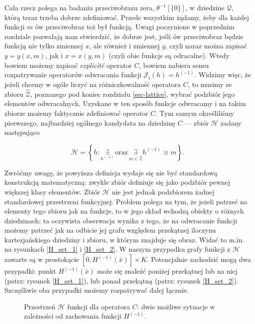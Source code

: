 Cała rzecz polega na badaniu przeciwobrazu zera, $\theta^{-1}[\{ 0 \}]$, w dziedzine $\mathcal{Q}$, którą teraz trzeba dobrze zdefiniować. Przede wszystkim żądamy, żeby dla każdej funkcji $m$ ów przeciwobraz też był funkcją. Uwagi poczynione w poprzednim rozdziale pozwalają nam stwierdzić, że dobrze jest, jeśli ów przeciwobraz będzie funkcją nie tylko zmiennej $x$, ale również i zmiennej $y$, czyli naraz można zapisać $y=y(x,m)$, jak i $x=x(y,m)$ (czyli obie funkcje są odracalne). Wtedy bowiem możemy zapisać {\it explicit\' e} operator $C$, bowiem nabiera sensu rozpatrywanie operatorów odwracania funkcji $\mathcal{J}_{i} (h) = h^{(-1)}$. Widzimy więc, że jeżeli chcemy w ogóle liczyć na różniczkowalność operatora $C$, to musimy ze zbioru $\hat{\mathcal{Z}}$, poznanego pod koniec rozdziału \ref{sec-lattice}, wybrać podzbiór jego elementów odwracalnych. Uzyskane w ten sposób funkcje odwracamy i na takim zbiorze możemy faktycznie zdefiniować operator $C$. Tym samym określiliśmy pierwszego, najbardziej ogólnego kandydata na dziedzinę $C$ --- zbiór $\mathcal{H}$ zadany następująco

\begin{equation*}
\mathcal{H}= \left \{ h : \underset{ h^{(-1)}}{\exists} \, \mathrm{oraz}\, \underset{ m \in \hat{\mathcal{Z}}}{\exists}  h^{(-1)} \equiv m \right \}.
\end{equation*} 

Zwróćmy uwagę, że powyższa definicja wydaje się nie być standardową konstrukcją matematyczną: zwykle zbiór definiuje się jako podzbiór pewnej większej klasy elementów. Zbiór $\mathcal{H}$ nie jest jednak podzbiorem żadnej standardowej przestrzeni funkcyjnej. Problem polega na tym, że jeżeli patrzeć na elementy tego zbioru jak na funkcje, to w jego skład wchodzą obiekty o różnych dziedzinach: ta oczywista obserwacja wynika z tego, że na odwracanie funkcji możemy patrzeć jak na odbicie jej grafu względem przekątnej iloczynu kartezjańskiego dziedziny i zbioru, w którym znajduje się obraz. Widać to m.in. na rysunkach \ref{H_set_1} i \ref{H_set_2}. W naszym przypadku grafy funkcji z $\mathcal{H}$ zawarte są w prostokącie $[0, H^{(-1)}(\bar{x})]  \times K$. Potencjalnie zachodzić mogą dwa przypadki: punkt $H^{(-1)}(\bar{x})$ może się znaleźć poniżej przekątnej lub na niej (patrz: rysunek \ref{H_set_1}), lub ponad przekątną (patrz: rysunek \ref{H_set_2}). Szczęśliwie oba przypadki możemy rozpatrywać dalej łącznie.

\begin{figure}
	\begin{center}
	\end{center}
	\caption[Przestrzeń $\mathcal{H}$ funkcji dla operatora $C$]{Przestrzeń $\mathcal{H}$ funkcji dla operatora $C$: dwie możliwe sytuacje w zależności od zachowania funkcji $H^{(-1)}$.
	\\ }
\end{figure}

